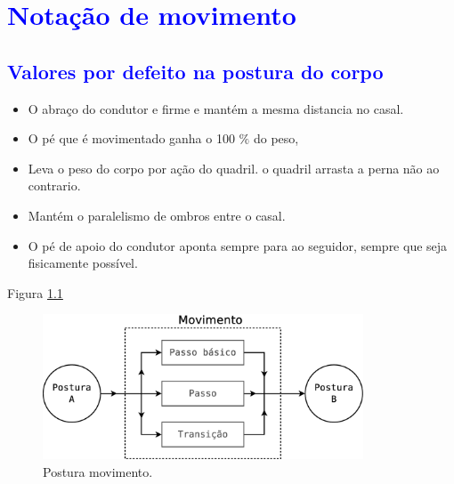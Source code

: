 

\chapter{\textcolor{blue}{Notação de movimento}}





\section{\textcolor{blue}{Valores por defeito na postura do corpo}}


\begin{itemize}
\item O abraço do condutor e firme e mantém a mesma distancia no casal.
\item O pé que é movimentado ganha o 100 $\%$ do peso,
\item Leva o peso do corpo por ação do quadril. o quadril arrasta a perna não ao contrario.
\item Mantém o paralelismo de ombros entre o casal.
\item O pé de apoio do condutor aponta sempre para ao seguidor, sempre que seja fisicamente possível.
\end{itemize}

Figura \ref{fig:postura-movimento}

\begin{figure}[h]
  \centering
    \includegraphics[width=0.85\textwidth]{chapters/cap-partituramov/postura-movimento.eps}
  \caption{Postura movimento.}
  \label{fig:postura-movimento}
\end{figure}


